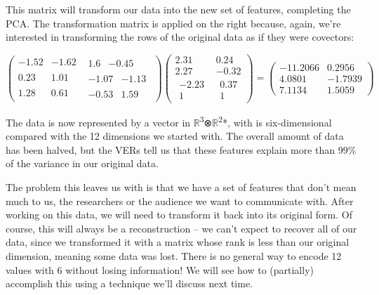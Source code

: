 \documentclass[oneside,english]{amsbook}
\numberwithin{section}{chapter}
\theoremstyle{plain}
\theoremstyle{definition}
\begin{document}
This matrix will transform our data into the new set of features,
completing the PCA. The transformation matrix is applied on the right
because, again, we're interested in transforming the rows of the
original data as if they were covectors:

\[\begin{pmatrix}
	- 1.52 & - 1.62 & \begin{matrix}
		1.6 & - 0.45
	\end{matrix} \\
	0.23 & 1.01 & \begin{matrix}
		- 1.07 & - 1.13
	\end{matrix} \\
	1.28 & 0.61 & \begin{matrix}
		- 0.53 & 1.59
	\end{matrix}
\end{pmatrix}\begin{pmatrix}
	2.31 & 0.24 \\
	2.27 & - 0.32 \\
	\begin{matrix}
		- 2.23 \\
		1
	\end{matrix} & \begin{matrix}
		0.37 \\
		1
	\end{matrix}
\end{pmatrix} = \begin{pmatrix}
	- 11.2066 & 0.2956 \\
	4.0801 & - 1.7939 \\
	7.1134 & 1.5059
\end{pmatrix}\]

The data is now represented by a vector in
$\mathbb{R}$\textsuperscript{3}⊗$\mathbb{R}$\textsuperscript{2}*, with is
six-dimensional compared with the 12 dimensions we started with. The
overall amount of data has been halved, but the VERs tell us that these
features explain more than 99\% of the variance in our original data.

The problem this leaves us with is that we have a set of features that
don't mean much to us, the researchers or the audience we want to
communicate with. After working on this data, we will need to transform
it back into its original form. Of course, this will always be a
reconstruction -- we can't expect to recover all of our data, since we
transformed it with a matrix whose rank is less than our original
dimension, meaning some data was lost. There is no general way to encode
12 values with 6 without losing information! We will see how to
(partially) accomplish this using a technique we'll discuss next time.
\end{document}

